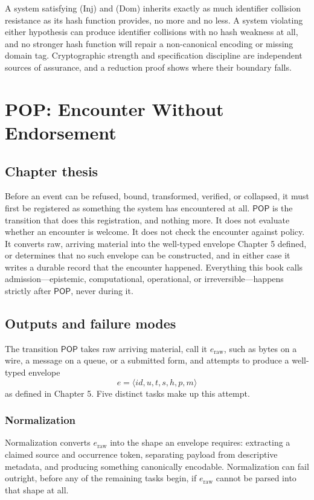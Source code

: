 \documentclass[11pt,openany]{book}
\newcommand{\Pop}{\mathsf{POP}}
\begin{document}
A system satisfying (Inj) and (Dom) inherits exactly as much identifier
collision resistance as its hash function provides, no more and no less. A
system violating either hypothesis can produce identifier collisions with no
hash weakness at all, and no stronger hash function will repair a
non-canonical encoding or missing domain tag. Cryptographic strength and
specification discipline are independent sources of assurance, and a
reduction proof shows where their boundary falls.

\chapter{POP: Encounter Without Endorsement}
\section{Chapter thesis}

Before an event can be refused, bound, transformed, verified, or collapsed, it
must first be registered as something the system has encountered at all.
\(\Pop\) is the transition that does this registration, and nothing more. It
does not evaluate whether an encounter is welcome. It does not check the
encounter against policy. It converts raw, arriving material into the
well-typed envelope Chapter 5 defined, or determines that no such envelope can
be constructed, and in either case it writes a durable record that the
encounter happened. Everything this book calls admission---epistemic,
computational, operational, or irreversible---happens strictly after \(\Pop\),
never during it.

\section{Outputs and failure modes}

The transition \(\Pop\) takes raw arriving material, call it
\(e_{\mathrm{raw}}\), such as bytes on a wire, a message on a queue, or a
submitted form, and attempts to produce a well-typed envelope
\[
 e=\langle id,u,t,s,h,p,m\rangle
\]
as defined in Chapter 5. Five distinct tasks make up this attempt.

\subsection{Normalization}

Normalization converts \(e_{\mathrm{raw}}\) into the shape an envelope
requires: extracting a claimed source and occurrence token, separating payload
from descriptive metadata, and producing something canonically encodable.
Normalization can fail outright, before any of the remaining tasks begin, if
\(e_{\mathrm{raw}}\) cannot be parsed into that shape at all.
\end{document}
